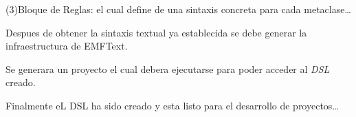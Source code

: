 { (3)Bloque de Reglas: el cual define de una sintaxis concreta para cada metaclase\ldots\\
 \item {Despues de obtener la sintaxis textual ya establecida se debe generar la infraestructura de EMFText}.
 \begin{center}
 \par
 \end{center}
 \item{Se generara un proyecto el cual debera ejecutarse para poder acceder al \textit{DSL} creado.}
 \begin{center}
 \par
 \end{center}
 }
 
 Finalmente eL DSL ha sido creado y esta listo para el desarrollo de proyectos\ldots 
 
 
 
                                               
